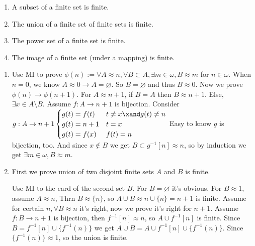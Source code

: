 \documentclass{ctexart}
\begin{document}
\begin{problem}
  \begin{enumerate}[ref=\theproblem.\arabic*]
    \item\label{it:2.1} A subset of a finite set is finite.
    \item\label{it:2.2} The union of a finite set of finite sets is finite.
    \item The power set of a finite set is finite.
    \item The image of a finite set (under a mapping) is finite.
  \end{enumerate}
\end{problem}

\begin{solution}
  \begin{enumerate}
    \item Use MI to prove $\phi(n):=\forall A\approx n,\forall B\subset A,\exists m\in \omega,B\approx m$ for $n\in \omega$. When $n=0$, we know $A\approx 0\to A=\varnothing$. So $B=\varnothing$ and thus $B\approx 0$. Now we prove $\phi(n)\to \phi(n+1)$. For $A\approx n+1$, if $B=A$ then $B\approx n+1$. Else, $\exists x\in A\setminus B$. Assume $f:A\to n+1$ is bijection. Consider $g:A\to n+1
      \begin{cases}
        g(t)=f(t) & t\neq x\xand g(t)\neq n \\
        g(t)=n+1  & t=x                     \\
        g(t)=f(x) & f(t)=n
      \end{cases}$
      Easy to know $g$ is bijection, too. And since $x\notin B$ we get $B\subset g^{-1}[n]\approx n$, so by induction we get $\exists m\in \omega,B\approx m$.
    \item First we prove union of two disjoint finite sets $A$ and $B$ is finite.

      Use MI to the card of the second set $B$. For $B=\varnothing$ it's obvious. For $B\approx 1$, assume $A\approx n$, Thrn $B\approx \{n\}$, so $A\cup B\approx n\cup\{n\}=n+1$ is finite. Assume for certain $n,\forall B\approx n$ it's right, now we prove it's right for $n+1$. Assume $f:B\to n+1$ is bijection, then $f^{-1}[n]\approx n$, so $A\cup f^{-1}[n]$ is finite. Since $B=f^{-1}[n]\cup\{f^{-1}(n)\}$ we get $A\cup B=A\cup f^{-1}[n]\cup\{f^{-1}(n)\}$. Since $\{f^{-1}(n)\}\approx 1$, so the union is finite.


\end{enumerate}
\end{solution}
\end{document}
